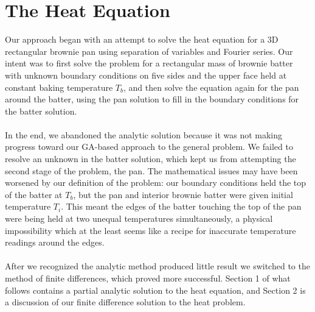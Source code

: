 \documentclass[12pt]{reedmcm}
\begin{document}
\section{The Heat Equation}
Our approach began with an attempt to solve the heat equation for a 3D rectangular brownie pan using separation of variables and Fourier series.  Our intent was to first solve the problem for a rectangular mass of brownie batter with unknown boundary conditions on five sides and the upper face held at constant baking temperature $T_b$, and then solve the equation again for the pan around the batter, using the pan solution to fill in the boundary conditions for the batter solution.\\
\\
In the end, we abandoned the analytic solution because it was not making progress toward our GA-based approach to the general problem.  We failed to resolve an unknown in the batter solution, which kept us from attempting the second stage of the problem, the pan.  The mathematical issues may have been worsened by our definition of the problem: our boundary conditions held the top of the batter at $T_b$, but the pan and interior brownie batter were given initial temperature $T_i$.  This meant the edges of the batter touching the top of the pan were being held at two unequal temperatures simultaneously, a physical impossibility which at the least seems like a recipe for inaccurate temperature readings around the edges.\\
\\
After we recognized the analytic method produced little result we switched to the method of finite differences, which proved more successful.  Section 1 of what follows contains a partial analytic solution to the heat equation, and Section 2 is a discussion of our finite difference solution to the heat problem.\\
\end{document}
